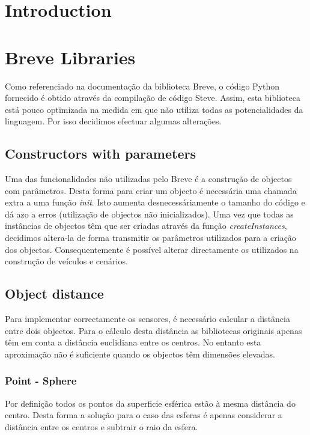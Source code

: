\documentclass[a4paper]{article}
\title{\documentTitle}
\author{\documentAuthors{}}
\begin{document}
\maketitle
\cleardoublepage

\tableofcontents
\cleardoublepage

\setlength{\parindent}{1cm}
\setlength{\parskip}{0.3cm}

\section{Introduction}

\cleardoublepage
\section{Breve Libraries}
\indent \indent Como referenciado na documentação da biblioteca Breve, o código Python fornecido é obtido através da compilação de código Steve.
Assim, esta biblioteca está pouco optimizada na medida em que não utiliza todas as potencialidades da linguagem. 
Por isso decidimos efectuar algumas alterações.

\subsection{Constructors with parameters}
\indent \indent Uma das funcionalidades não utilizadas pelo Breve é a construção de objectos com parâmetros.
Desta forma para criar um objecto é necessária uma chamada extra a uma função \emph{init}.
Isto aumenta desnecessáriamente o tamanho do código e dá azo a erros (utilização de objectos não inicializados).
Uma vez que todas as instâncias de objectos têm que ser criadas através da função \emph{createInstances}, decidimos altera-la de forma transmitir os parâmetros utilizados para a criação dos objectos. 
Consequentemente é possível alterar directamente os utilizados na construção de veículos e cenários.

\subsection{Object distance}
\indent \indent Para implementar correctamente os sensores, é necessário calcular a distância entre dois objectos.
Para o cálculo desta distância as bibliotecas originais apenas têm em conta a distância euclidiana entre os centros.
No entanto esta aproximação não é suficiente quando os objectos têm dimensões elevadas.

\subsubsection{Point - Sphere}
\indent \indent Por definição todos os pontos da superficie esférica estão à mesma distância do centro.
Desta forma a solução para o caso das esferas é apenas considerar a distância entre os centros e subtrair o raio da esfera.
\end{document}
